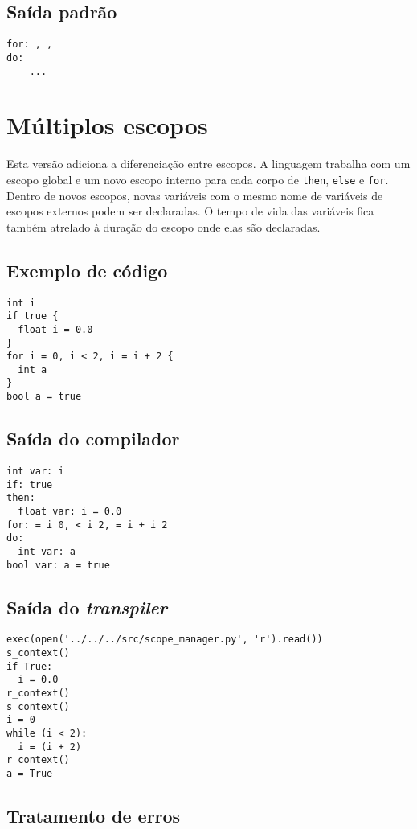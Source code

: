 \documentclass{sftex/sftex}
\begin{document}
\subsection{Saída padrão}

\begin{verbatim}
for: , ,
do:
    ...
\end{verbatim}

\section{Múltiplos escopos}

Esta versão adiciona a diferenciação entre escopos. A linguagem trabalha com
um escopo global e um novo escopo interno para cada corpo de \verb!then!,
\verb!else! e \verb!for!. Dentro de novos escopos, novas variáveis com o
mesmo nome de variáveis de escopos externos podem ser declaradas. O tempo de
vida das variáveis fica também atrelado à duração do escopo onde elas são
declaradas.

\subsection{Exemplo de código}

\begin{verbatim}
int i
if true {
  float i = 0.0
}
for i = 0, i < 2, i = i + 2 {
  int a
}
bool a = true
\end{verbatim}

\subsection{Saída do compilador}

\begin{verbatim}
int var: i
if: true
then:
  float var: i = 0.0
for: = i 0, < i 2, = i + i 2
do:
  int var: a
bool var: a = true
\end{verbatim}

\subsection{Saída do \emph{transpiler}}

\begin{verbatim}
exec(open('../../../src/scope_manager.py', 'r').read())
s_context()
if True:
  i = 0.0
r_context()
s_context()
i = 0
while (i < 2):
  i = (i + 2)
r_context()
a = True
\end{verbatim}

\subsection{Tratamento de erros}
\end{document}
